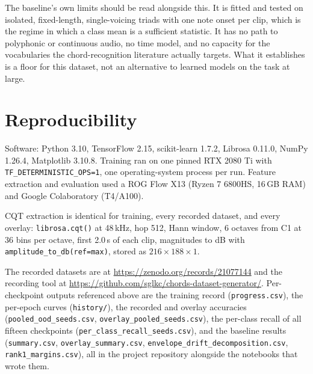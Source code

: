 \documentclass[pdflatex,sn-mathphys-num]{sn-jnl}
\begin{document}
The baseline's own limits should be read alongside this. It is fitted and tested on isolated, fixed-length, single-voicing triads with one note onset per clip, which is the regime in which a class mean is a sufficient statistic. It has no path to polyphonic or continuous audio, no time model, and no capacity for the vocabularies the chord-recognition literature actually targets. What it establishes is a floor for this dataset, not an alternative to learned models on the task at large.

\section{Reproducibility}\label{sec:repro}

Software: Python 3.10, TensorFlow 2.15, scikit-learn 1.7.2, Librosa 0.11.0, NumPy 1.26.4, Matplotlib 3.10.8. Training ran on one pinned RTX 2080 Ti with \texttt{TF\_DETERMINISTIC\_OPS=1}, one operating-system process per run. Feature extraction and evaluation used a ROG Flow X13 (Ryzen 7 6800HS, 16\,GB RAM) and Google Colaboratory (T4/A100).

CQT extraction is identical for training, every recorded dataset, and every overlay: \texttt{librosa.cqt()} at 48\,kHz, hop 512, Hann window, 6 octaves from C1 at 36 bins per octave, first 2.0\,s of each clip, magnitudes to dB with \texttt{amplitude\_to\_db(ref=max)}, stored as $216\times188\times1$.

The recorded datasets are at \url{https://zenodo.org/records/21077144} and the recording tool at \url{https://github.com/sglkc/chords-dataset-generator/}. Per-checkpoint outputs referenced above are the training record (\texttt{progress.csv}), the per-epoch curves (\texttt{history/}), the recorded and overlay accuracies (\texttt{pooled\_ood\_seeds.csv}, \texttt{overlay\_pooled\_seeds.csv}), the per-class recall of all fifteen checkpoints (\texttt{per\_class\_recall\_seeds.csv}), and the baseline results (\texttt{summary.csv}, \texttt{overlay\_summary.csv}, \texttt{envelope\_drift\_decomposition.csv}, \texttt{rank1\_margins.csv}), all in the project repository alongside the notebooks that wrote them.


\end{document}
